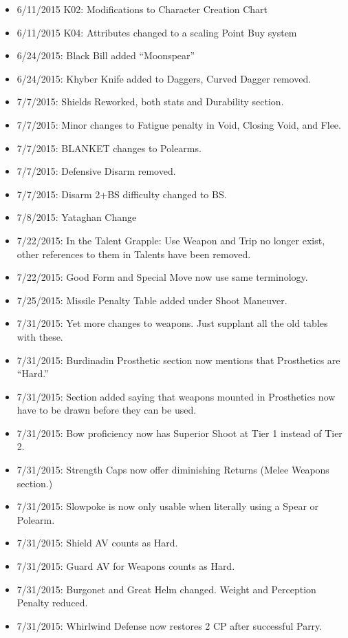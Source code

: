 \documentclass[oneside,11pt,english]{book}
\begin{document}
{\begin{itemize}
\item 6/11/2015 K02: Modifications to Character Creation Chart 
\item 6/11/2015 K04: Attributes changed to a scaling Point Buy system 
\item 6/24/2015: Black Bill added “Moonspear” 
\item 6/24/2015: Khyber Knife added to Daggers, Curved Dagger removed. 
\item 7/7/2015: Shields Reworked, both stats and Durability section. 
\item 7/7/2015: Minor changes to Fatigue penalty in Void, Closing Void, and Flee. 
\item 7/7/2015: BLANKET changes to Polearms. 
\item 7/7/2015: Defensive Disarm removed. 
\item 7/7/2015: Disarm 2+BS difficulty changed to BS. 
\item 7/8/2015: Yataghan Change 
\item 7/22/2015: In the Talent Grapple: Use Weapon and Trip no longer exist, other references to them in 
Talents have been removed. 
\item 7/22/2015: Good Form and Special Move now use same terminology. 
\item 7/25/2015: Missile Penalty Table added under Shoot Maneuver. 
\item 7/31/2015: Yet more changes to weapons. Just supplant all the old tables with these. 
\item 7/31/2015: Burdinadin Prosthetic section now mentions that Prosthetics are “Hard.” 
\item 7/31/2015: Section added saying that weapons mounted in Prosthetics now have to be drawn before they 
can be used. 
\item 7/31/2015: Bow proficiency now has Superior Shoot at Tier 1 instead of Tier 2. 
\item 7/31/2015: Strength Caps now offer diminishing Returns (Melee Weapons section.) 
\item 7/31/2015: Slowpoke is now only usable when literally using a Spear or Polearm. 
\item 7/31/2015: Shield AV counts as Hard. 
\item 7/31/2015: Guard AV for Weapons counts as Hard. 
\item 7/31/2015: Burgonet and Great Helm changed. Weight and Perception Penalty reduced. 
\item 7/31/2015: Whirlwind Defense now restores 2 CP after successful Parry.\ 

\end{itemize}}
\end{document}
